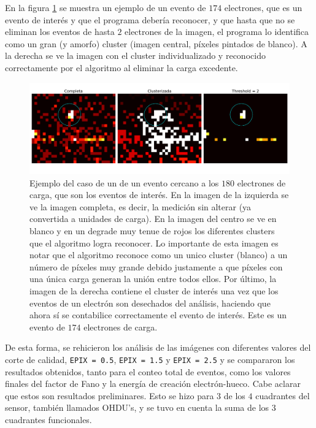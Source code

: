 \indent En la figura \ref{fig:ClusterPegoteado} se muestra un ejemplo de un evento de $174$ electrones, que es un evento de interés y que el programa debería reconocer, y que hasta que no se eliminan los eventos de hasta $2$ electrones de la imagen, el programa lo identifica como un gran (y amorfo) cluster (imagen central, píxeles pintados de blanco). A la derecha se ve la imagen con el cluster individualizado y reconocido correctamente por el algoritmo al eliminar la carga excedente.
\begin{figure}[H]
    \centering
    \includegraphics[scale=0.4]{Figs/despegoteo_clusters.pdf}
    \caption{\footnotesize{Ejemplo del caso de un de un evento cercano a los $180$ electrones de carga, que son los eventos de interés. En la imagen de la izquierda se ve la imagen completa, es decir, la medición sin alterar (ya convertida a unidades de carga). En la imagen del centro se ve en blanco y en un degrade muy tenue de rojos los diferentes clusters que el algoritmo logra reconocer. Lo importante de esta imagen es notar que el algoritmo reconoce como un unico cluster (blanco) a un número de píxeles muy grande debido justamente a que píxeles con una única carga generan la unión entre todos ellos. Por último, la imagen de la derecha contiene el cluster de interés una vez que los eventos de un electrón son desechados del análisis, haciendo que ahora sí se contabilice correctamente el evento de interés. Este es un evento de $174$ electrones de carga.}}
    \label{fig:ClusterPegoteado}
\end{figure}
De esta forma, se rehicieron los análisis de las imágenes con diferentes valores del corte de calidad, \verb|EPIX = 0.5|, \verb|EPIX = 1.5| y \verb|EPIX = 2.5| y se compararon los resultados obtenidos, tanto para el conteo total de eventos, como los valores finales del factor de Fano y la energía de creación electrón-hueco. Cabe aclarar que estos son resultados preliminares. Esto se hizo para $3$ de los $4$ cuadrantes del sensor, también llamados OHDU's, y se tuvo en cuenta la suma de los 3 cuadrantes funcionales.\\
